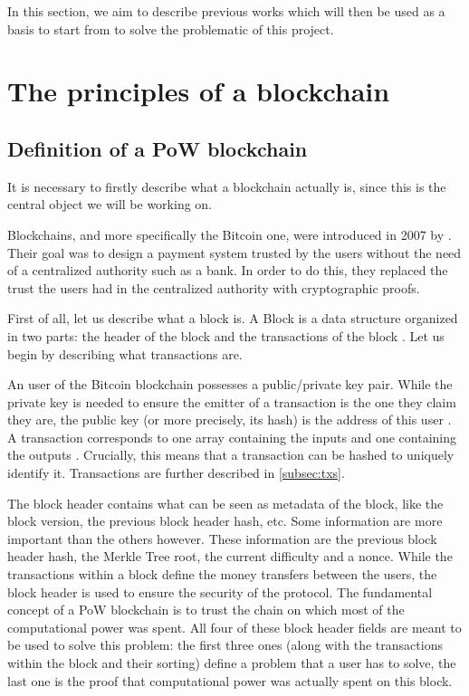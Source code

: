     In this section, we aim to describe previous works which will then be used as a basis to start from to solve the problematic of this project.
    \section{The principles of a blockchain}
      \subsection{Definition of a PoW blockchain}
        It is necessary to firstly describe what a blockchain actually is, since this is the central object we will be working on.
        
        Blockchains, and more specifically the Bitcoin one, were introduced in 2007 by \citeauthor{Bitcoin} \cite{Bitcoin}. Their goal was to design a payment system trusted by the users without the need of a centralized authority such as a bank. In order to do this, they replaced the trust the users had in the centralized authority with cryptographic proofs.
        
        First of all, let us describe what a block is. A Block is a data structure organized in two parts: the header of the block and the transactions of the block \cite{BitcoinHeader}. Let us begin by describing what transactions are.
        
        An user of the Bitcoin blockchain possesses a public/private key pair. While the private key is needed to ensure the emitter of a transaction is the one they claim they are, the public key (or more precisely, its hash) is the address of this user \cite{BitcoinTX}. A transaction corresponds to one array containing the inputs and one containing the outputs \cite{SoK}. Crucially, this means that a transaction can be hashed to uniquely identify it. Transactions are further described in \autoref{subsec:txs}.
        
        The block header contains what can be seen as metadata of the block, like the block version, the previous block header hash, etc. Some information are more important than the others however. These information are the previous block header hash, the Merkle Tree root, the current difficulty and a nonce. While the transactions within a block define the money transfers between the users, the block header is used to ensure the security of the protocol. The fundamental concept of a PoW blockchain is to trust the chain on which most of the computational power was spent. All four of these block header fields are meant to be used to solve this problem: the first three ones (along with the transactions within the block and their sorting) define a problem that a user has to solve, the last one is the proof that computational power was actually spent on this block.
        
